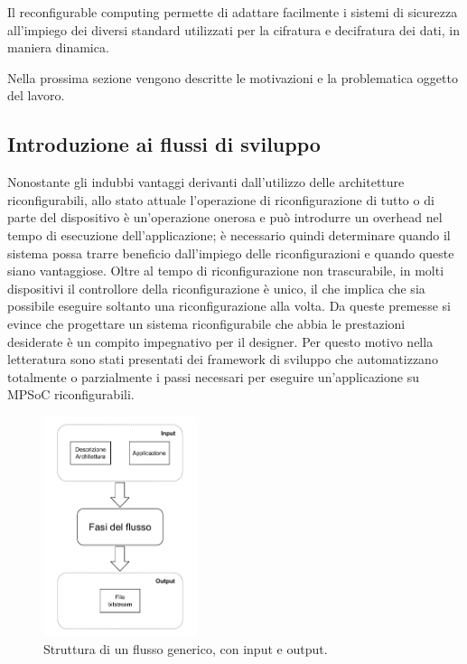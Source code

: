Il reconfigurable computing permette di adattare facilmente i sistemi di sicurezza
all'impiego dei diversi standard utilizzati per la cifratura e decifratura dei dati, in
maniera dinamica.

Nella prossima sezione vengono descritte le motivazioni e la problematica oggetto del
lavoro.


\subsection{Introduzione ai flussi di sviluppo}
\label{subsec:introFlussi}


Nonostante gli indubbi vantaggi derivanti dall'utilizzo delle architetture riconfigurabili,
allo stato attuale l'operazione di riconfigurazione di tutto o di parte del dispositivo \`e
un'operazione onerosa e pu\`o introdurre un overhead nel tempo di esecuzione dell'applicazione;
\`e necessario quindi determinare quando il sistema possa trarre beneficio dall'impiego delle
riconfigurazioni e quando queste siano vantaggiose. Oltre al tempo di riconfigurazione non trascurabile,
in molti dispositivi il controllore della riconfigurazione \`e unico, il che implica che sia possibile
eseguire soltanto una riconfigurazione alla volta.
Da queste premesse si evince che progettare un sistema riconfigurabile che abbia le prestazioni desiderate
\`e un compito impegnativo per il designer. Per questo motivo nella letteratura sono stati presentati dei framework
di sviluppo che automatizzano totalmente o parzialmente i passi necessari per eseguire un'applicazione
su MPSoC riconfigurabili.

\begin{figure}[t]
  \begin{center}
    \includegraphics[width=0.4\textwidth]{./capitoli/figure/cap1/StrutturaFlusso.pdf}
    \caption{Struttura di un flusso generico, con input e output.}
    \label{fig:strutturaFlusso}
  \end{center}
\end{figure}

